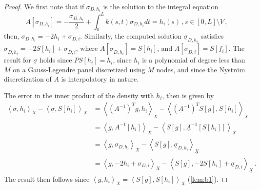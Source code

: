 \documentclass[12pt,times]{elsarticle}
\newcommand{\usigma}{\underline{\sigma}}
\newcommand{\uX}{\underline{X}}
\begin{document}
{\begin{proof}
We first note that if $\sigma_{D,h_{i}}$ is the solution to the integral equation
\begin{equation}
A[\sigma_{D,h_{i}}] = -\frac{\sigma_{D,h_{i}}}{2} + \int_{0}^{L} k(s,t) \sigma_{D,h_{i}} dt = h_{i}(s) \, , s \in [0,L] \setminus V \, ,
\end{equation}
then, $\sigma_{D,h_{i}} = -2h_{i} + \sigma_{D,i}$. 
Similarly, the computed solution $\usigma_{D,h_{i}}$ satisfies $\usigma_{D,h_{i}} = -2S[h_{i}] + \usigma_{D,i}$, where
$\underline{A} [\usigma_{D,h_{i}}] = S[h_{i}]$, and $\underline{A}[\usigma_{D,i}] = S[f_{i}]$. The result for $\usigma$ holds since $PS[h_{i}] = h_{i}$, since $h_{i}$ is a polynomial of degree less than $M$ on a Gauss-Legendre panel discretized using $M$ nodes, and since the Nystr\"{o}m discretization of $A$ is interpolatory in nature.

The error in the inner product of the density with $h_{i}$, then is given by
\begin{equation}
\begin{aligned}
\left< \sigma, h_{i} \right>_{X} -  \left< \usigma, S[h_{i}] \right>_{\uX} &=
\left< (A^{-1})^{T}g, h_{i} \right>_{X} -  \left< (\underline{A}^{-1})^{T}S[g], S[h_{i}] \right>_{\uX}   \\
&=\left< g, A^{-1}[h_{i}] \right>_{X} -  \left< S[g], \underline{A}^{-1}[S[h_{i}]] \right>_{\uX}   \\
&=\left< g, \sigma_{D,h_{i}} \right>_{X} -  \left< S[g], \usigma_{D,h_{i}} \right>_{\uX}   \\
&=\left< g, -2h_{i} + \sigma_{D,i} \right>_{X} -  \left< S[g], -2S[h_{i}] + \usigma_{D,i} \right>_{\uX}   \, .
\end{aligned}
\end{equation}
The result then follows since $\left<g,h_{i} \right>_{X} = \left<S[g],S[h_{i}] \right>_{\uX}$ (\cref{lem:b1}).
\end{proof}

}
\end{document}
